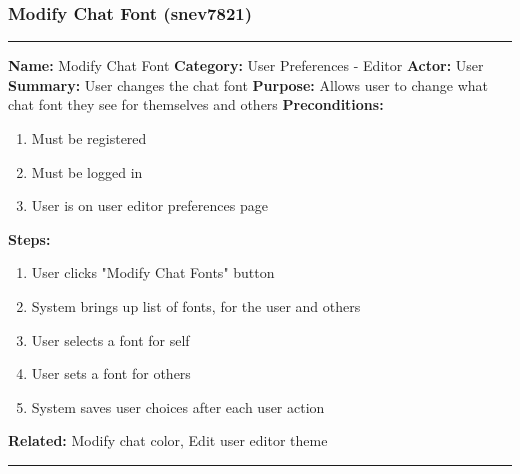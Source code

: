 \documentclass[11pt]{report}
\begin{document}
\subsubsection{Modify Chat Font (snev7821)}
\vspace{2pt}
\hrule
\vspace{8pt}
	\noindent\textbf{Name:} Modify Chat Font \newline
	\textbf{Category:} User Preferences - Editor  \newline
	\textbf{Actor:} User \newline
	\textbf{Summary:} User changes the chat font \newline
	\textbf{Purpose:} Allows user to change what chat font they see for themselves and others \newline
	\textbf{Preconditions:}
	\begin{enumerate}
		\item Must be registered
		\item Must be logged in
		\item User is on user editor preferences page
	\end{enumerate}
	\textbf{Steps:}
	\begin{enumerate}
		\item User clicks "Modify Chat Fonts" button
		\item System brings up list of fonts, for the user and others
		\item User selects a font for self
		\item User sets a font for others
		\item System saves user choices after each user action
	\end{enumerate}
	\textbf{Related:} Modify chat color, Edit user editor theme
\vspace{8pt}
\hrule
\newpage
\end{document}
